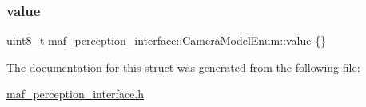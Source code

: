 \subsubsection{\texorpdfstring{value}{value}}
{\footnotesize\ttfamily uint8\+\_\+t maf\+\_\+perception\+\_\+interface\+::\+Camera\+Model\+Enum\+::value \{\}}



The documentation for this struct was generated from the following file\+:\begin{DoxyCompactItemize}
\item 
\hyperlink{maf__perception__interface_8h}{maf\+\_\+perception\+\_\+interface.\+h}\end{DoxyCompactItemize}
